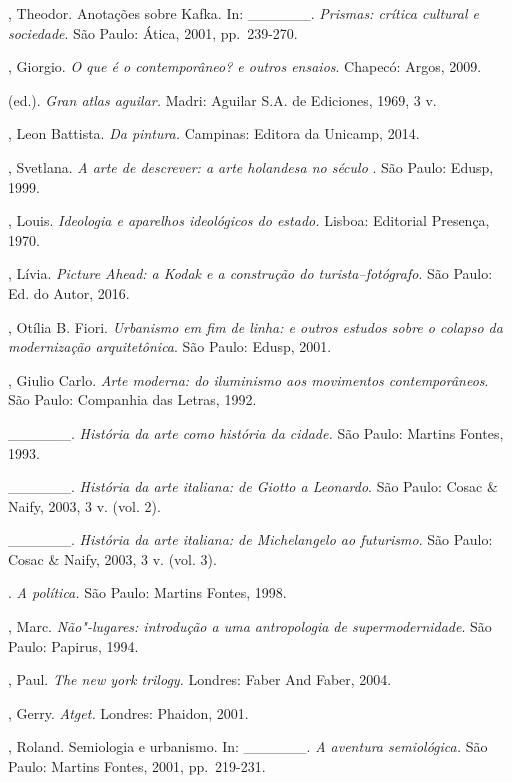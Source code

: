 \begin{Parskip}
, Theodor. Anotações sobre Kafka. In: \_\_\_\_\_\_.
\emph{Prismas: crítica cultural e sociedade}. São Paulo: Ática, 2001,
pp.~239-270.

, Giorgio. \emph{O que é o contemporâneo? e outros ensaios}.
Chapecó: Argos, 2009.

 (ed.). \emph{Gran atlas aguilar.} Madri: Aguilar S.A. de
Ediciones, 1969, 3 v.

, Leon Battista. \emph{Da pintura.} Campinas: Editora da
Unicamp, 2014.

, Svetlana. \emph{A arte de descrever: a arte holandesa no
século }. São Paulo: Edusp, 1999.

, Louis. \emph{Ideologia e aparelhos ideológicos do estado.}
Lisboa: Editorial Presença, 1970.

, Lívia. \emph{Picture Ahead: a Kodak e a construção do
turista--fotógrafo}. São Paulo: Ed. do Autor, 2016.

, Otília B. Fiori. \emph{Urbanismo em fim de linha: e outros
estudos sobre o colapso da modernização arquitetônica}. São Paulo: Edusp,
2001.

, Giulio Carlo. \emph{Arte moderna: do iluminismo aos movimentos
contemporâneos}. São Paulo: Companhia das Letras, 1992.

\_\_\_\_\_\_. \emph{História da arte como história da cidade.} São
Paulo: Martins Fontes, 1993.

\_\_\_\_\_\_. \emph{História da arte italiana: de Giotto a
Leonardo}. São Paulo: Cosac \& Naify, 2003, 3 v. (vol. 2).

\_\_\_\_\_\_. \emph{História da arte italiana: de Michelangelo ao
futurismo}. São Paulo: Cosac \& Naify, 2003, 3 v. (vol. 3).

. \emph{A política.} São Paulo: Martins Fontes, 1998.

, Marc. \emph{Não"-lugares: introdução a uma antropologia de
supermodernidade}. São Paulo: Papirus, 1994.

, Paul. \emph{The new york trilogy.} Londres: Faber And Faber,
2004.

, Gerry. \emph{Atget.} Londres: Phaidon, 2001.

, Roland. Semiologia e urbanismo. In: \_\_\_\_\_\_. \emph{A
aventura semiológica.} São Paulo: Martins Fontes, 2001, pp.~219-231.


\end{Parskip}

